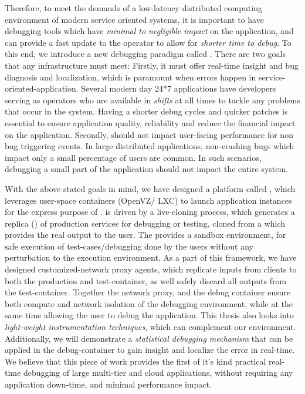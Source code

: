Therefore, to meet the demands of a low-latency distributed computing environment of modern service oriented systems, it is important to have debugging tools which have \textit{minimal to negligible impact} on the application, and can provide a fast update to the operator to allow for \textit{shorter time to debug}.
To this end, we introduce a new debugging paradigm called \livedebugging.
There are two goals that any \livedebugging infrastructure must meet:
Firstly, it must offer real-time insight and bug diagnosis and localization, which is paramount when errors happen in service-oriented-application. 
Several modern day 24*7 applications have developers serving as operators who are available in \textit{shifts} at all times to tackle any problems that occur in the system.
Having a shorter debug cycles and quicker patches is essential to ensure application quality, reliability and reduce the financial impact on the application.
Secondly, \livedebugging should not impact user-facing performance for non bug triggering events.
In large distributed applications, non-crashing bugs which impact only a small percentage of users are common. 
In such scenarios, debugging a small part of the application should not impact the entire system.

With the above stated goals in mind, we have designed a platform called \parikshan, which leverages user-space containers (OpenVZ/ LXC) to launch application instances for the express purpose of \livedebugging. 
\parikshan is driven by a  live-cloning process, which generates a replica (\debugcontainer) of production services for debugging or testing, cloned from a \productioncontainer which provides the real output to the user.
The \debugcontainer provides a sandbox environment, for safe execution of test-cases/debugging done by the users without any perturbation to the execution environment.
As a part of this framework, we have designed customized-network proxy agents, which replicate inputs from clients to both the production and test-container, as well safely discard all outputs from the test-container.
Together the network proxy, and the debug container ensure both compute and network isolation of the debugging environment, while at the same time allowing the user to debug the application.
This thesis also looks into \textit{light-weight instrumentation techniques}, which can complement our \livedebugging environment.
Additionally, we will demonstrate a \textit{statistical debugging mechanism} that can be applied in the debug-container to gain insight and localize the error in real-time. 
We believe that this piece of work provides the first of it's kind practical real-time debugging of large multi-tier and cloud applications, without requiring any application down-time, and minimal performance impact.

